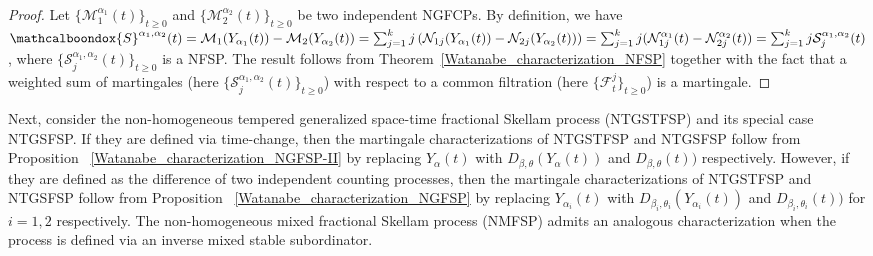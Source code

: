 \documentclass[11pt,oneside,reqno]{amsart}
\theoremstyle{definition}
\theoremstyle{remarkstyle}
\begin{document}
\begin{proof}
Let $\{\mathcal{M}_{1}^{\alpha_1}(t)\}_{t\ge 0}$ and $\{\mathcal{M}_{2}^{\alpha_2}(t)\}_{t\ge 0}$ be two independent NGFCPs. By definition, we have $\mathcalboondox{S}^{\alpha_1,\alpha_2}(t)=\mathcal{M}_{1}(Y_{\alpha_1}(t))-\mathcal{M}_{2}(Y_{\alpha_2}(t))=\sum_{j=1}^{k}j\left(\mathcal{N}_{1j}(Y_{\alpha_1}(t))-\mathcal{N}_{2j}(Y_{\alpha_2}(t))\right)=\sum_{j=1}^{k}j(\mathcal{N}_{1j}^{\alpha_1}(t)-\mathcal{N}_{2j}^{\alpha_2}(t))=\sum_{j=1}^{k}j\mathcal{S}_{j}^{\alpha_1,\alpha_2}(t)$, where $\{\mathcal{S}_{j}^{\alpha_1,\alpha_2}(t)\}_{t\ge 0}$ is a NFSP. The result follows from Theorem~\ref{Watanabe_characterization_NFSP} together with the fact that a weighted sum of martingales (here $\{\mathcal{S}_{j}^{\alpha_1,\alpha_2}(t)\}_{t\ge 0}$) with respect to a common filtration (here $\{\mathcal{F}_t^j\}_{t\ge 0}$) is a martingale.
\end{proof}
Next, consider the non-homogeneous tempered generalized space-time fractional Skellam process (NTGSTFSP) and its special case NTGSFSP. If they are defined via time-change, then the martingale characterizations of NTGSTFSP and NTGSFSP follow from Proposition ~\ref{Watanabe_characterization_NGFSP-II} by replacing $Y_\alpha(t)$ with $D_{\beta,\theta}(Y_\alpha(t))$ and $D_{\beta,\theta}(t))$ respectively. However, if they are defined as the difference of two independent counting processes, then the martingale characterizations of NTGSTFSP and NTGSFSP follow from Proposition ~\ref{Watanabe_characterization_NGFSP} by replacing $Y_{\alpha_i}(t)$ with $D_{\beta_i,\theta_i}(Y_{\alpha_i}(t))$ and $D_{\beta_i,\theta_i}(t))$ for $i=1,2$ respectively. The non-homogeneous mixed fractional Skellam process (NMFSP) admits an analogous characterization when the process is defined via an inverse mixed stable subordinator.
\end{document}
